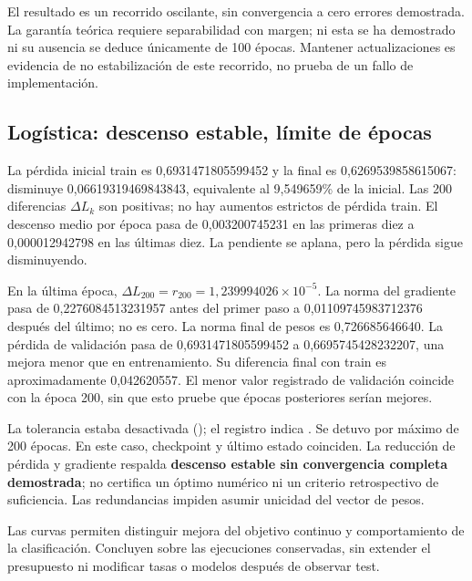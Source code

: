 El resultado es un recorrido oscilante, sin convergencia a cero errores demostrada. La garantía teórica requiere separabilidad con margen; ni esta se ha demostrado ni su ausencia se deduce únicamente de 100 épocas. Mantener actualizaciones es evidencia de no estabilización de este recorrido, no prueba de un fallo de implementación.

\subsection{Logística: descenso estable, límite de épocas}

La pérdida inicial train es 0,6931471805599452 y la final es 0,6269539858615067: disminuye 0,06619319469843843, equivalente al 9,549659\% de la inicial. Las 200 diferencias $\Delta L_k$ son positivas; no hay aumentos estrictos de pérdida train. El descenso medio por época pasa de 0,003200745231 en las primeras diez a 0,000012942798 en las últimas diez. La pendiente se aplana, pero la pérdida sigue disminuyendo.

En la última época, $\Delta L_{200}=r_{200}=1,239994026\times10^{-5}$. La norma del gradiente pasa de 0,2276084513231957 antes del primer paso a 0,01109745983712376 después del último; no es cero. La norma final de pesos es 0,726685646640. La pérdida de validación pasa de 0,6931471805599452 a 0,6695745428232207, una mejora menor que en entrenamiento. Su diferencia final con train es aproximadamente 0,042620557. El menor valor registrado de validación coincide con la época 200, sin que esto pruebe que épocas posteriores serían mejores.

La tolerancia estaba desactivada (); el registro indica . Se detuvo por máximo de 200 épocas. En este caso, checkpoint y último estado coinciden. La reducción de pérdida y gradiente respalda \textbf{descenso estable sin convergencia completa demostrada}; no certifica un óptimo numérico ni un criterio retrospectivo de suficiencia. Las redundancias impiden asumir unicidad del vector de pesos.

Las curvas permiten distinguir mejora del objetivo continuo y comportamiento de la clasificación. Concluyen sobre las ejecuciones conservadas, sin extender el presupuesto ni modificar tasas o modelos después de observar test.
